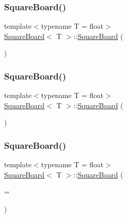 \subsubsection{\texorpdfstring{Square\+Board()}{SquareBoard()}\hspace{0.1cm}{\footnotesize\ttfamily [2/6]}}
{\footnotesize\ttfamily template$<$typename T  = float$>$ \\
\mbox{\hyperlink{classSquareBoard}{Square\+Board}}$<$ T $>$\+::\mbox{\hyperlink{classSquareBoard}{Square\+Board}} (\begin{DoxyParamCaption}\item[{\mbox{\hyperlink{classSquareBoard}{Square\+Board}}$<$ T $>$ \&\&}]{ }\end{DoxyParamCaption})\hspace{0.3cm}{\ttfamily [default]}}

\mbox{\label{classSquareBoard_a9a6c27e98ae10d6cb601140ef6a3ff59}} 
\subsubsection{\texorpdfstring{Square\+Board()}{SquareBoard()}\hspace{0.1cm}{\footnotesize\ttfamily [3/6]}}
{\footnotesize\ttfamily template$<$typename T  = float$>$ \\
\mbox{\hyperlink{classSquareBoard}{Square\+Board}}$<$ T $>$\+::\mbox{\hyperlink{classSquareBoard}{Square\+Board}} (\begin{DoxyParamCaption}\item[{const \mbox{\hyperlink{classSquareBoard}{Square\+Board}}$<$ T $>$ \&}]{ }\end{DoxyParamCaption})\hspace{0.3cm}{\ttfamily [default]}}

\mbox{\label{classSquareBoard_aa7aac1a02a00ce9ad0c9441fffa71e02}} 
\subsubsection{\texorpdfstring{Square\+Board()}{SquareBoard()}\hspace{0.1cm}{\footnotesize\ttfamily [4/6]}}
{\footnotesize\ttfamily template$<$typename T  = float$>$ \\
\mbox{\hyperlink{classSquareBoard}{Square\+Board}}$<$ T $>$\+::\mbox{\hyperlink{classSquareBoard}{Square\+Board}} (\begin{DoxyParamCaption}\item[{unsigned}]{ = {} }\end{DoxyParamCaption})}

